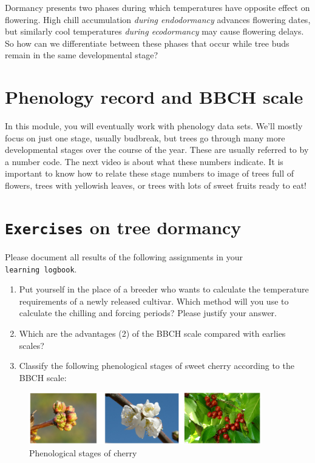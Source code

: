\documentclass[
]{book}
\providecommand{\tightlist}{%
  \setlength{\itemsep}{0pt}\setlength{\parskip}{0pt}}
\begin{document}
Dormancy presents two phases during which temperatures have opposite effect on flowering. High chill accumulation \emph{during endodormancy} advances flowering dates, but similarly cool temperatures \emph{during ecodormancy} may cause flowering delays. So how can we differentiate between these phases that occur while tree buds remain in the same developmental stage?

\hypertarget{phenology-record-and-bbch-scale}{%
\section{Phenology record and BBCH scale}\label{phenology-record-and-bbch-scale}}

In this module, you will eventually work with phenology data sets. We'll mostly focus on just one stage, usually budbreak, but trees go through many more developmental stages over the course of the year. These are usually referred to by a number code. The next video is about what these numbers indicate. It is important to know how to relate these stage numbers to image of trees full of flowers, trees with yellowish leaves, or trees with lots of sweet fruits ready to eat!

\hypertarget{exercises_dormancy}{%
\section*{\texorpdfstring{\texttt{Exercises} on tree dormancy}{Exercises on tree dormancy}}\label{exercises_dormancy}}

Please document all results of the following assignments in your \texttt{learning\ logbook}.

\begin{enumerate}
\def\labelenumi{\arabic{enumi})}
\tightlist
\item
  Put yourself in the place of a breeder who wants to calculate the temperature requirements of a newly released cultivar. Which method will you use to calculate the chilling and forcing periods? Please justify your answer.\\
\item
  Which are the advantages (2) of the BBCH scale compared with earlies scales?
\item
  Classify the following phenological stages of sweet cherry according to the BBCH scale:
\end{enumerate}

\begin{figure}
\centering
\includegraphics[width=0.9\textwidth,height=\textheight]{pictures/pheno_stages.png}
\caption{Phenological stages of cherry}
\end{figure}
\end{document}

